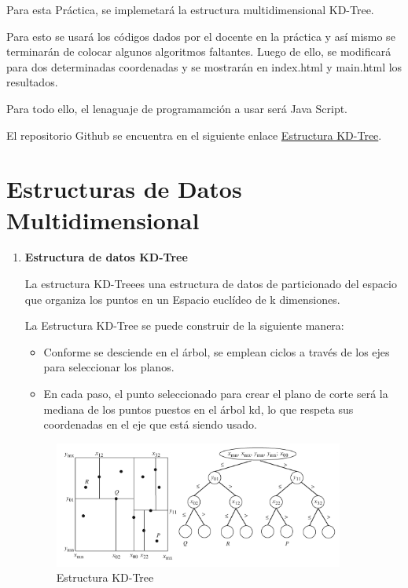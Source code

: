 \documentclass{article}
\begin{document}
	Para esta Práctica, se implemetará la estructura multidimensional KD-Tree.

    Para esto se usará los códigos dados por el docente en la práctica y así mismo se terminarán de colocar algunos algoritmos faltantes. Luego de ello, se modificará para dos determinadas coordenadas y se mostrarán en index.html y main.html los resultados.

    Para todo ello, el lenaguaje de programamción a usar será Java Script.
	
 El repositorio Github se encuentra en el siguiente enlace \href{https://github.com/nestorcal/kdtree}{Estructura KD-Tree}.
	
	\section{Estructuras de Datos Multidimensional}\label{sec:ejercicios}
	\begin{enumerate}
		\item \textbf{Estructura de datos KD-Tree}
		
			La estructura KD-Treees una estructura de datos de particionado del espacio que organiza los puntos en un Espacio euclídeo de k dimensiones.

La Estructura KD-Tree se puede construir de la siguiente manera: 

\begin{itemize}
   \item Conforme se desciende en el árbol, se emplean ciclos a través de los ejes para seleccionar los planos.
   \item En cada paso, el punto seleccionado para crear el plano de corte será la mediana de los puntos puestos en el árbol kd, lo que respeta sus coordenadas en el eje que está siendo usado.

\end{itemize}	

\begin{figure}[H]
\centering
\includegraphics[width=0.9\textwidth]{Img/KD-Tree.png}
\caption{Estructura KD-Tree}
\end{figure}

\end{enumerate}
\end{document}

